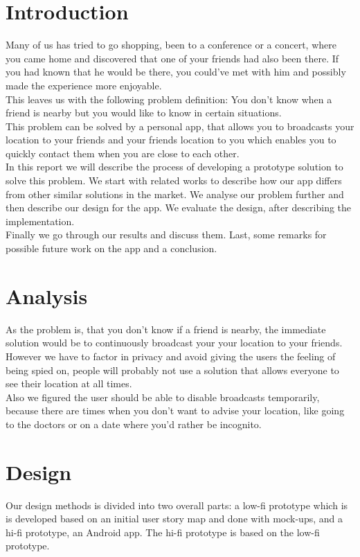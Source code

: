 \documentclass[runningheads,a4paper]{llncs}
\begin{document}
\section{Introduction}
Many of us has tried to go shopping, been to a conference or a concert, where you came home and discovered that one of your friends had also been there. If you had known that he would be there, you could’ve met with him and possibly made the experience more enjoyable.\\

This leaves us with the following problem definition: You don’t know when a friend is nearby but you would like to know in certain situations. \\

This problem can be solved by a personal app, that allows you to  broadcasts your location to your friends and your friends location to you which enables you to quickly contact them when you are close to each other.\\

In this report we will describe the process of developing a prototype solution to solve this problem.
We start with related works to describe how our app differs from other similar solutions in the market. 
We analyse our problem further and then describe our design for the app. We evaluate the design, after describing the implementation. \\
Finally we go through our results and discuss them. Last, some remarks for possible future work on the app and a conclusion. 

\section{Analysis}
As the problem is, that you don’t know if a friend is nearby, the immediate solution would be to continuously broadcast your your location to your friends.
However we have to factor in privacy and avoid giving the users the feeling of being spied on, people will probably not use a solution that allows everyone to see their location at all times.\\
Also we figured the user should be able to disable broadcasts temporarily, because there are times when you don't want to advise your location, like going to the doctors or on a date where you’d rather be incognito. 

\section{Design}
Our design methods is divided into two overall parts: a low-fi prototype which is is developed based on an initial user story map and done with mock-ups, and a hi-fi prototype, an Android app. The hi-fi prototype is based on the low-fi prototype. \\
\end{document}

